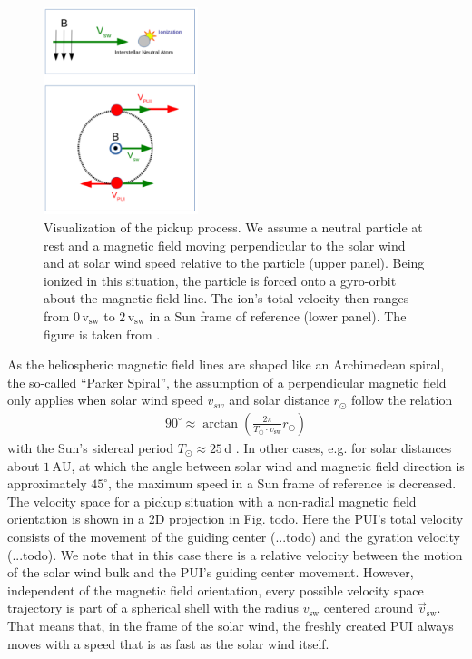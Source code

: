 \begin{figure}[h]
	\includegraphics[width=0.4\textwidth]{Figures/pu_process_1_2.png}
	\centering
	\caption{Visualization of the pickup process. We assume a neutral particle at rest and a magnetic field moving perpendicular to the solar wind and at solar wind speed relative to the particle (upper panel). Being ionized in this situation, the particle is forced onto a gyro-orbit about the magnetic field line. The ion's total velocity then ranges from $0\, \mathrm{v_{\mathrm{sw}}} $ to $2 \, \mathrm{v_{\mathrm{sw}}}$ in a Sun frame of reference (lower panel). The figure is taken from \citet{talk_etss}.}
	\label{fig:pu_proc}
\end{figure}
As the heliospheric magnetic field lines are shaped like an Archimedean spiral, the so-called ``Parker Spiral'', the assumption of a perpendicular magnetic field only applies when solar wind speed $v_{sw}$ and solar distance $r_\odot$ follow the relation
\begin{align*}
90 ^\circ \approx  \arctan \left( \frac{2\pi}{T_\odot \cdot v_{\mathrm{sw}}} r_\odot \right)
\end{align*}
with the Sun's sidereal period $T_\odot \approx 25\,\mathrm{d}$ \citep{prlss_2004}.
In other cases, e.g. for solar distances about $1\,\mathrm{AU}$, at which the angle between solar wind and magnetic field direction is approximately $45^\circ$, the maximum speed in a Sun frame of reference is decreased.
\\
The velocity space for a pickup situation with a non-radial magnetic field orientation is shown in a 2D projection in Fig. todo. Here the PUI's total velocity consists of the movement of the guiding center (...todo) and the gyration velocity (...todo). We note that in this case there is a relative velocity between the motion of the solar wind bulk and the PUI's guiding center movement. However, independent of the magnetic field orientation, every possible velocity space trajectory is part of a spherical shell with the radius $v_{\mathrm{sw}}$ centered around $\vec{v}_{\mathrm{sw}}$. That means that, in the frame of the solar wind, the freshly created PUI always moves with a speed that is as fast as the solar wind itself.
